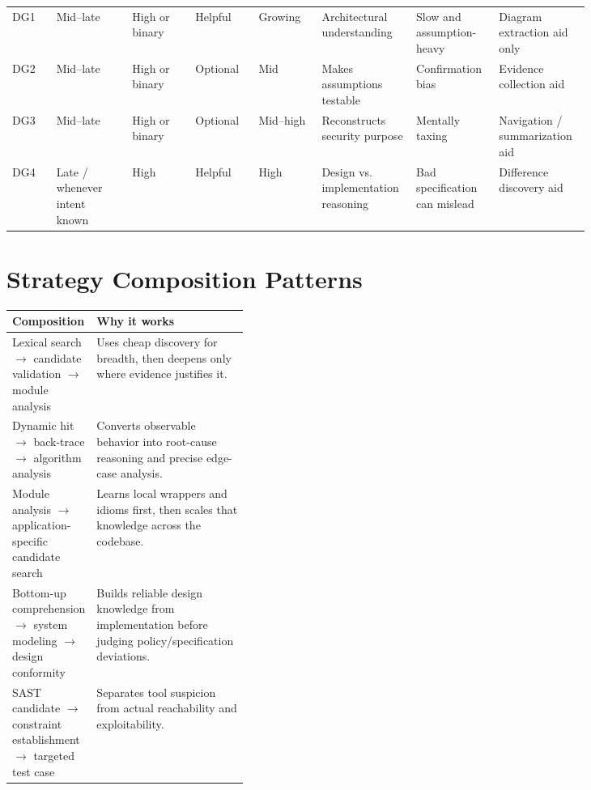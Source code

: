 \documentclass[10pt]{article}
\begin{document}
\begin{longtable}{@{}L{0.07\linewidth}L{0.12\linewidth}L{0.10\linewidth}L{0.10\linewidth}L{0.10\linewidth}L{0.11\linewidth}L{0.11\linewidth}L{0.12\linewidth}@{}}
DG1 & Mid--late & High or binary & Helpful & Growing & Architectural understanding & Slow and assumption-heavy & Diagram extraction aid only \\
DG2 & Mid--late & High or binary & Optional & Mid & Makes assumptions testable & Confirmation bias & Evidence collection aid \\
DG3 & Mid--late & High or binary & Optional & Mid--high & Reconstructs security purpose & Mentally taxing & Navigation / summarization aid \\
DG4 & Late / whenever intent known & High & Helpful & High & Design vs. implementation reasoning & Bad specification can mislead & Difference discovery aid \\
\bottomrule
\end{longtable}
\normalsize

\section{Strategy Composition Patterns}
\par\smallskip\noindent\begin{tabularx}{\linewidth}{@{}L{0.34\linewidth}Y@{}}
\toprule
Composition & Why it works \\
\midrule
Lexical search $\rightarrow$ candidate validation $\rightarrow$ module analysis & Uses cheap discovery for breadth, then deepens only where evidence justifies it. \\
Dynamic hit $\rightarrow$ back-trace $\rightarrow$ algorithm analysis & Converts observable behavior into root-cause reasoning and precise edge-case analysis. \\
Module analysis $\rightarrow$ application-specific candidate search & Learns local wrappers and idioms first, then scales that knowledge across the codebase. \\
Bottom-up comprehension $\rightarrow$ system modeling $\rightarrow$ design conformity & Builds reliable design knowledge from implementation before judging policy/specification deviations. \\
SAST candidate $\rightarrow$ constraint establishment $\rightarrow$ targeted test case & Separates tool suspicion from actual reachability and exploitability. \\
\bottomrule
\end{tabularx}
\clearpage
\end{document}
